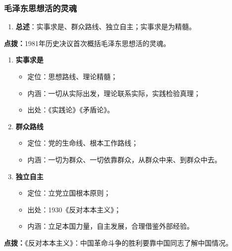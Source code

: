 \subsubsection{毛泽东思想活的灵魂}
\begin{enumerate}
    \item \textbf{总述}：实事求是、群众路线、独立自主；实事求是为精髓。
\end{enumerate}
\vspace{0.4em}
\noindent\sloppy\colorbox{orange!10}{
    \begin{minipage}{0.92\textwidth}
        \textbf{点拨：}1981年历史决议首次概括毛泽东思想活的灵魂。
    \end{minipage}
}
\vspace{0.4em}

\begin{enumerate}[resume]
    \item \textbf{\color{red}实事求是}
    \begin{itemize}
        \item 定位：思想路线、理论精髓；
        \item 内涵：一切从实际出发，理论联系实际，实践检验真理；
        \item 出处：《实践论》《矛盾论》。
    \end{itemize}

    \item \textbf{\color{red}群众路线}
    \begin{itemize}
        \item 定位：党的生命线、根本工作路线；
        \item 内涵：一切为群众、一切依靠群众，从群众中来、到群众中去。
    \end{itemize}

    \item \textbf{\color{red}独立自主}
    \begin{itemize}
        \item 定位：立党立国根本原则；
        \item 出处：1930《反对本本主义》；
        \item 内涵：立足本国力量，自主发展，合理借鉴外部经验。
    \end{itemize}
\end{enumerate}
\vspace{0.4em}
\noindent\sloppy\colorbox{orange!10}{
    \begin{minipage}{0.92\textwidth}
        \textbf{点拨：}《反对本本主义》：中国革命斗争的胜利要靠中国同志了解中国情况。
    \end{minipage}
}
\vspace{0.4em}


